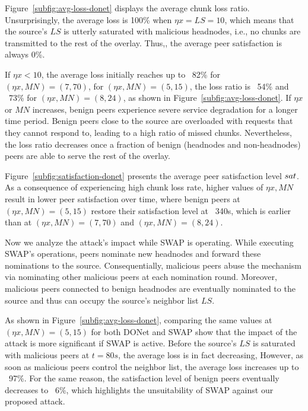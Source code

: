 Figure~\ref{subfig:avg-loss-donet} displays the average chunk loss ratio.
Unsurprisingly, the average loss is 100\% when $\eta x= LS =10$, which means that the source's $LS$ is utterly saturated with malicious headnodes, i.e., no chunks are transmitted to the rest of the overlay.
Thus,, the average peer satisfaction is always 0\%. 

If $\eta x < 10$, the average loss initially reaches up to ~82\% for $(\eta x, MN)=(7, 70)$, for $(\eta x, MN)=(5, 15)$, the loss ratio is ~54\% and ~73\% for $(\eta x, MN)=(8, 24)$, as shown in Figure~\ref{subfig:avg-loss-donet}.
If $\eta x$ or $MN$ increases, benign peers experience severe service degradation for a longer time period. 
Benign peers close to the source are overloaded with requests that they cannot respond to, leading to a high ratio of missed chunks. 
Nevertheless, the loss ratio decreases once a fraction of benign (headnodes and non-headnodes) peers are able to serve the rest of the overlay.

Figure~\ref{subfig:satisfaction-donet} presents the average peer satisfaction level $sat$.
As a consequence of experiencing high chunk loss rate, higher values of $\eta x, MN$ result in lower peer satisfaction over time, where benign peers at $(\eta x, MN)=(5, 15)$ restore their satisfaction level at ~340s, which is earlier than at $(\eta x, MN)=(7, 70)$ and $(\eta x, MN)=(8, 24)$.

Now we analyze the attack's impact while SWAP is operating.
While executing SWAP's operations, peers nominate new headnodes and forward these nominations to the source. 
Consequentially, malicious peers abuse the mechanism via nominating other malicious peers at each nomination round. 
Moreover, malicious peers connected to benign headnodes are eventually nominated to the source and thus can occupy the source's neighbor list $LS$. 

As shown in Figure~\ref{subfig:avg-loss-donet}, comparing the same values at $(\eta x, MN)=(5, 15)$ for both DONet and SWAP show that the impact of the attack is more significant if SWAP is active.
Before the source's $LS$ is saturated with malicious peers at $t=80s$, the average loss is in fact decreasing, However, as soon as malicious peers control the neighbor list, the average loss increases up to ~97\%. 
For the same reason, the satisfaction level of benign peers eventually decreases to ~6\%, which highlights the unsuitability of SWAP against our proposed attack.

